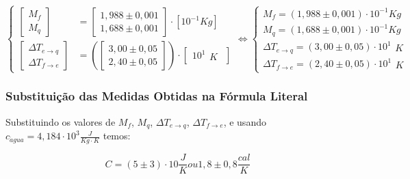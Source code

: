 \documentclass[a4paper]{article}
\begin{document}
			\[
			\begin{cases}
				\left[\begin{array}{c}
					M_{f}\\
					M_{q}
				\end{array}\right] & =\left[\begin{array}{c}
					1,988\pm0,001\\
					1,688\pm0,001
				\end{array}\right]\cdot\left[10^{-1}Kg\right]\\
				\left[\begin{array}{c}
					\Delta T_{e\rightarrow q}\\
					\Delta T_{f\rightarrow e}
				\end{array}\right] & =\left(\left[\begin{array}{c}
					3,00\pm0,05\\
					2,40\pm0,05
				\end{array}\right]\right)\cdot\left[\begin{array}{c}
					10^{1}\begin{array}{c}
					K\end{array}\end{array}\right]
			\end{cases}\Longleftrightarrow\begin{cases}
				M_{f}=\left(1,988\pm0,001\right)\cdot10^{-1}\unit{Kg}\\
				M_{q}=\left(1,688\pm0,001\right)\cdot10^{-1}\unit{Kg}\\
				\Delta T_{e\rightarrow q}=\left(3,00\pm0,05\right)\cdot10^{1}\begin{array}{c}
				\unit{K}\end{array}\\
				\Delta T_{f\rightarrow e}=\left(2,40\pm0,05\right)\cdot10^{1}\begin{array}{c}
				\unit{K}\end{array}
			\end{cases}
			\]

		\subsubsection{Substituição das Medidas Obtidas na Fórmula Literal}

			Substituindo os valores de $M_{f}$, $M_{q}$, $\Delta T_{e\rightarrow q}$,
			$\Delta T_{f\rightarrow e}$, e usando $c_{\acute{a}gua}=4,184\cdot10^{3}\unit{\frac{J}{Kg\cdot K}}$
			temos:

			$$C=\left(5\pm3\right)\cdot10\unit{\frac{J}{K}} ou 1,8\pm0,8\unit{\frac{cal}{K}}$$
\end{document}
